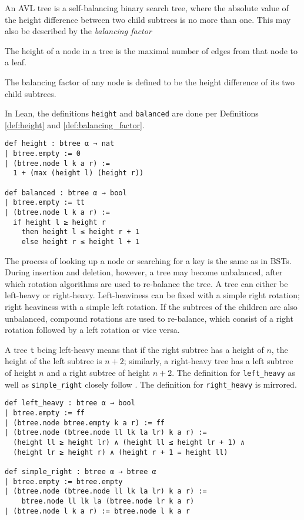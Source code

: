 An AVL tree \cite{avl:original} is a self-balancing binary search tree, where the absolute value of the height difference between two child subtrees is no more than one.
This may also be described by the \textit{balancing factor}

\begin{definition}
  \label{def:height}
  The height of a node in a tree is the maximal number of edges from that node to a leaf.
\end{definition}

\begin{definition}
  \label{def:balancing_factor}
  The balancing factor of any node is defined to be the height difference of its two child subtrees.
\end{definition}

In Lean, the definitions \lstinline{height} and \lstinline{balanced} are done per Definitions \ref{def:height} and \ref{def:balancing_factor}.

\begin{lstlisting}
def height : btree α → nat
| btree.empty := 0
| (btree.node l k a r) :=
  1 + (max (height l) (height r))

def balanced : btree α → bool
| btree.empty := tt
| (btree.node l k a r) :=
  if height l ≥ height r 
    then height l ≤ height r + 1
    else height r ≤ height l + 1
\end{lstlisting}

The process of looking up a node or searching for a key is the same as in BSTs. During insertion and deletion, however, a tree may become unbalanced, after which rotation algorithms are used to re-balance the tree. A tree can either be left-heavy or right-heavy. Left-heaviness can be fixed with a simple right rotation; right heaviness with a simple left rotation. If the subtrees of the children are also unbalanced, compound rotations are used to re-balance, which consist of a right rotation followed by a left rotation or vice versa.

A tree \lstinline{t} being left-heavy means that if the right subtree has a height of $n$, the height of the left subtree is $n+2$; similarly, a right-heavy tree has a left subtree of height $n$ and a right subtree of height $n+2$. The definition for \lstinline{left_heavy} as well as \lstinline{simple_right} closely follow \cite{textbook:discrete_computer}. The definition for \lstinline{right_heavy} is mirrored.

\begin{lstlisting}
def left_heavy : btree α → bool
| btree.empty := ff
| (btree.node btree.empty k a r) := ff
| (btree.node (btree.node ll lk la lr) k a r) :=
  (height ll ≥ height lr) ∧ (height ll ≤ height lr + 1) ∧
  (height lr ≥ height r) ∧ (height r + 1 = height ll)

def simple_right : btree α → btree α
| btree.empty := btree.empty
| (btree.node (btree.node ll lk la lr) k a r) := 
    btree.node ll lk la (btree.node lr k a r)
| (btree.node l k a r) := btree.node l k a r
\end{lstlisting}

